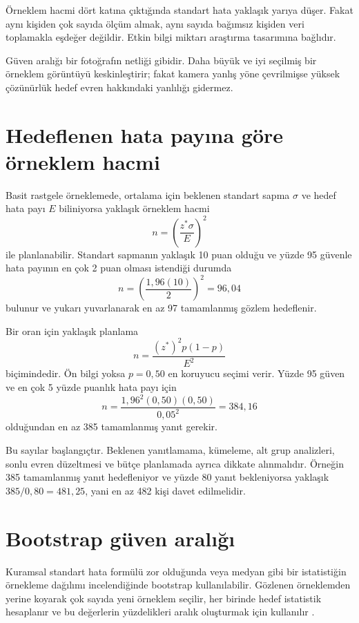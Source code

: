 Örneklem hacmi dört katına çıktığında standart hata yaklaşık yarıya düşer.
Fakat aynı kişiden çok sayıda ölçüm almak, aynı sayıda bağımsız kişiden veri
toplamakla eşdeğer değildir. Etkin bilgi miktarı araştırma tasarımına bağlıdır.

\begin{sezgibox}
Güven aralığı bir fotoğrafın netliği gibidir. Daha büyük ve iyi seçilmiş bir
örneklem görüntüyü keskinleştirir; fakat kamera yanlış yöne çevrilmişse yüksek
çözünürlük hedef evren hakkındaki yanlılığı gidermez.
\end{sezgibox}

\section{Hedeflenen hata payına göre örneklem hacmi}

Basit rastgele örneklemede, ortalama için beklenen standart sapma $\sigma$ ve
hedef hata payı $E$ biliniyorsa yaklaşık örneklem hacmi
\[
n=\left(\frac{z^*\sigma}{E}\right)^2
\]
ile planlanabilir. Standart sapmanın yaklaşık 10 puan olduğu ve yüzde 95
güvenle hata payının en çok 2 puan olması istendiği durumda
\[
n=\left(\frac{1{,}96(10)}{2}\right)^2=96{,}04
\]
bulunur ve yukarı yuvarlanarak en az 97 tamamlanmış gözlem hedeflenir.

Bir oran için yaklaşık planlama
\[
n=\frac{(z^*)^2p(1-p)}{E^2}
\]
biçimindedir. Ön bilgi yoksa $p=0{,}50$ en koruyucu seçimi verir. Yüzde 95
güven ve en çok 5 yüzde puanlık hata payı için
\[
n=\frac{1{,}96^2(0{,}50)(0{,}50)}{0{,}05^2}=384{,}16
\]
olduğundan en az 385 tamamlanmış yanıt gerekir.

Bu sayılar başlangıçtır. Beklenen yanıtlamama, kümeleme, alt grup analizleri,
sonlu evren düzeltmesi ve bütçe planlamada ayrıca dikkate alınmalıdır. Örneğin
385 tamamlanmış yanıt hedefleniyor ve yüzde 80 yanıt bekleniyorsa yaklaşık
$385/0{,}80=481{,}25$, yani en az 482 kişi davet edilmelidir.

\section{Bootstrap güven aralığı}

Kuramsal standart hata formülü zor olduğunda veya medyan gibi bir istatistiğin
örnekleme dağılımı incelendiğinde bootstrap kullanılabilir. Gözlenen
örneklemden yerine koyarak çok sayıda yeni örneklem seçilir, her birinde hedef
istatistik hesaplanır ve bu değerlerin yüzdelikleri aralık oluşturmak için
kullanılır \cite{efron1993}.

